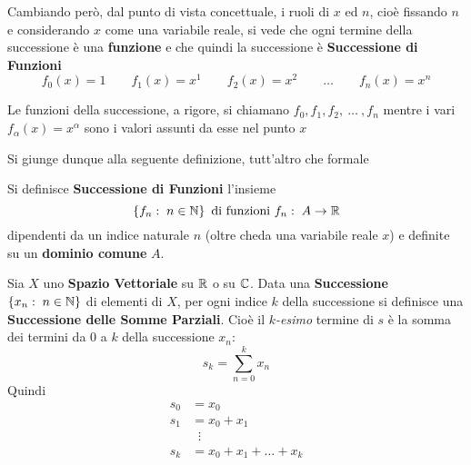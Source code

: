 Cambiando però, dal punto di vista concettuale, i ruoli di $x$ ed $n$, cioè fissando $n$ e considerando $x$ come una variabile reale, si vede che ogni termine della successione è una \textbf{funzione} e che quindi la successione è \textbf{Successione di Funzioni}
\[f_0(x) = 1 \qquad f_1(x) = x^1 \qquad f_2(x) = x^2  \qquad \dots \qquad f_n(x) = x^n\]
\vspace*{-\baselineskip}
\begin{note}
	Le funzioni della successione, a rigore, si chiamano $f_0, f_1, f_2 ,\:\dotsc\:, f_n$ mentre i vari $f_\alpha(x) = x^\alpha$ sono i valori assunti da esse nel punto $x$
\end{note}
Si giunge dunque alla seguente definizione, tutt'altro che formale
\begin{definition}
	\label{def:succ_funz}
	Si definisce \textbf{Successione di Funzioni} l'insieme
	\[\left\{f_n:\; n \in \mathbb{N}\right\} \text{ di funzioni } f_n:\; A \to \mathbb{R}\]
	dipendenti da un indice naturale $n$ (oltre cheda una variabile reale $x$) e definite su un \textbf{dominio comune} $A$.
\end{definition}

\begin{definition}
	\label{def:succ_somm_parz}
	Sia $X$ uno \textbf{Spazio Vettoriale} su $\mathbb{R}$ o su $\mathbb{C}$. Data una \textbf{Successione} $\left\{x_n:\; n \in \mathbb{N}\right\}$ di elementi di $X$, per ogni indice $k$ della successione si definisce una \textbf{Successione delle Somme Parziali}. Cioè il $k$\textit{-esimo} termine di $s$ è la somma dei termini da $0$ a $k$ della successione $x_n$:
	\[s_k = \sum\limits_{n = 0}^{k} x_n\]
	Quindi
	\begin{align*}
		s_0 &= x_0\\
		s_1 &= x_0 + x_1\\
		&\;\;\vdots\\
		s_k &= x_0 + x_1 + \dots + x_k
	\end{align*}
\end{definition}

